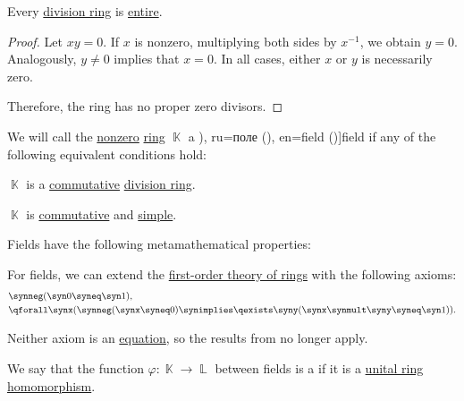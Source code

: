 \begin{proposition}\label{thm:division_ring_is_entire}
  Every \hyperref[def:division_ring]{division ring} is \hyperref[def:entire_semiring]{entire}.
\end{proposition}
\begin{proof}
  Let \( xy = 0 \). If \( x \) is nonzero, multiplying both sides by \( x^{-1} \), we obtain \( y = 0 \). Analogously, \( y \neq 0 \) implies that \( x = 0 \). In all cases, either \( x \) or \( y \) is necessarily zero.

  Therefore, the ring has no proper zero divisors.
\end{proof}

\begin{definition}\label{def:field}
  We will call the \hyperref[def:ring/trivial]{nonzero} \hyperref[def:ring]{ring} \( \BbbK \) a \term[bg=поле (\cite[394]{Обрешков1962ВисшаАлгебра}), ru=поле (\cite[113]{Тыртышников2017ОсновыАлгебры}), en=field (\cite[91]{Jacobson1985BasicAlgebraI})]{field} if any of the following equivalent conditions hold:
  \begin{thmenum}
     \( \BbbK \) is a \hyperref[def:ring/commutative]{commutative} \hyperref[def:division_ring]{division ring}.

    \mimprovised \( \BbbK \) is \hyperref[def:ring/commutative]{commutative} and \hyperref[def:ring/simple]{simple}.
  \end{thmenum}

  Fields have the following metamathematical properties:
  \begin{thmenum}
     For fields, we can extend the \hyperref[def:ring/theory]{first-order theory of rings} with the following axioms:
    \begin{align}
      &\synneg (\syn0 \syneq \syn1), \label{eq:def:field/theory/nonzero} \\
      &\qforall \synx (\synneg (\synx \syneq 0) \synimplies \qexists \syny (\synx \synmult \syny \syneq \syn1)). \label{eq:def:field/theory/invertibility}
    \end{align}

    Neither axiom is an \hyperref[def:fol_equation]{equation}, so the results from  no longer apply.

     We say that the function \( \varphi: \BbbK \to \BbbL \) between fields is a  if it is a \hyperref[def:ring/morphism]{unital ring homomorphism}.


\end{thmenum}
\end{definition}
